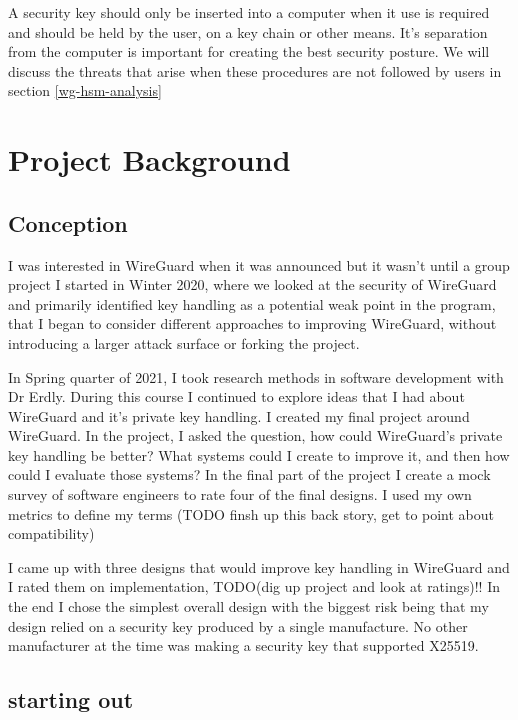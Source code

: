 \documentclass [11pt, proquest] {uwthesis}[2020/02/24]
\begin{document}
A security key should only be inserted into a computer when it use is required and should be held by the user, on a key chain or other means. It's separation from the computer is important for creating the best security posture. We will discuss the threats that arise when these procedures are not followed by users in section \ref{wg-hsm-analysis}

\chapter {Project Background}

\section {Conception}
I was interested in WireGuard when it was announced but it wasn't until a group project I started in Winter 2020, where we looked at the security of WireGuard and primarily identified key handling as a potential weak point in the program, that I began to consider different approaches to improving WireGuard,  without introducing a larger attack surface or forking the project. 

In Spring quarter of 2021, I took research methods in software development with Dr Erdly. During this course I continued to explore ideas that I had about WireGuard and it's private key handling. I created my final project around WireGuard. In the project, I asked the question, how could WireGuard's private key handling be better? What systems could I create to improve it, and then how could I evaluate those systems?  
In the final part of the project I create a mock survey of software engineers to rate four of the final designs. I used my own metrics to define my terms (TODO finsh up this back story, get to point about compatibility)

I came up with three designs that would improve key handling in WireGuard and I rated them on implementation, TODO(dig up project and look at ratings)!! In the end I chose the simplest overall design with the biggest risk being that my design relied on a security key produced by a single manufacture. No other manufacturer at the time was making a security key that supported X25519.

\section{starting out}
\end{document}
